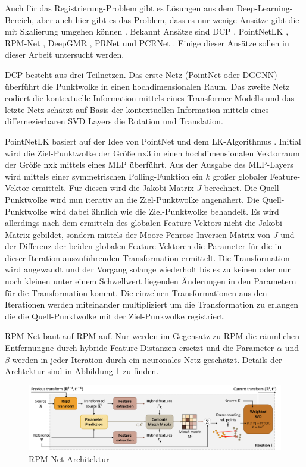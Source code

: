 \documentclass[12pt,titlepage, twoside]{article}
\begin{document}
Auch für das Registrierung-Problem gibt es Lösungen aus dem Deep-Learning-Bereich, aber auch hier gibt es das Problem, dass es nur wenige Ansätze gibt die mit Skalierung umgehen können \cite{ScaleLK}.
Bekannt Ansätze sind DCP \cite{Wang_2019_ICCV}, PointNetLK \cite{aoki2019pointnetlk}, RPM-Net \cite{Yew_2020}, DeepGMR \cite{yuan2020deepgmr}, PRNet \cite{wang2019prnet} und PCRNet \cite{sarode2019pcrnet}.
Einige dieser Ansätze sollen in dieser Arbeit untersucht werden.

DCP besteht aus drei Teilnetzen. Das erste Netz (PointNet oder DGCNN) überführt die Punktwolke in einen hochdimensionalen Raum. Das zweite Netz codiert die kontextuelle Information mittels eines Transformer-Modells 
und das letzte Netz schätzt auf Basis der kontextuellen Information mittels eines differnezierbaren SVD Layers die Rotation und Translation.

PointNetLK basiert auf der Idee von PointNet und dem LK-Algorithmus \cite{lk}. Initial wird die Ziel-Punktwolke der Größe nx3 in einen hochdimensionalen Vektorraum der Größe nxk mittels eines MLP überführt. 
Aus der Ausgabe des MLP-Layers wird mittels einer symmetrischen Polling-Funktion ein $k$ großer globaler Feature-Vektor ermittelt. Für diesen wird die Jakobi-Matrix $J$ berechnet.
Die Quell-Punktwolke wird nun iterativ an die Ziel-Punktwolke angenähert.
Die Quell-Punktwolke wird dabei ähnlich wie die Ziel-Punktwolke behandelt. Es wird allerdings nach dem ermitteln des globalen Feature-Vektors nicht die Jakobi-Matrix gebildet, 
sondern mittels der Moore-Penrose Inversen Matrix von $J$ und der Differenz der beiden globalen Feature-Vektoren die Parameter für die in dieser Iteration auszuführenden Transformation ermittelt.
Die Transformation wird angewandt und der Vorgang solange wiederholt bis es zu keinen oder nur noch kleinen unter einem Schwellwert liegenden Änderungen in den Parametern für die Transformation kommt.
Die einzelnen Transformationen aus den Iterationen werden miteinander multipliziert um die Transformation zu erlangen die die Quell-Punktwolke mit der Ziel-Punkwolke registriert.

RPM-Net baut auf RPM \cite{RPM} auf. Nur werden im Gegensatz zu RPM die räumlichen Entfernungne durch hybride Feature-Distanzen ersetzt und 
die Parameter $\alpha$ und $\beta$ werden in jeder Iteration durch ein neuronales Netz geschätzt. Details der Archtektur sind in Abbildung \ref{fig:rpm:net:arch} zu finden.

\begin{figure}
    \centering
    \includegraphics[width=1.0\textwidth]{./Images/RPM_Net_Arch.png}
    \caption{RPM-Net-Architektur \cite{Yew_2020}}
    \label{fig:rpm:net:arch}
\end{figure}
\end{document}
